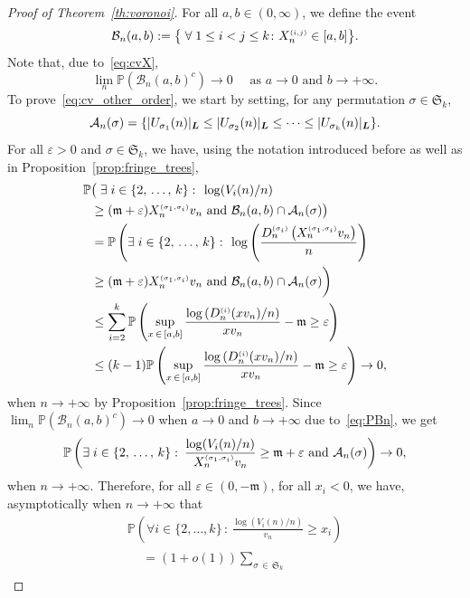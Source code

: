 \documentclass[AHL,Unicode,longabstracts,published]{cedram}
\newcommand{\bs}{\ensuremath{\boldsymbol}}
\newcommand{\sss}{\ensuremath{\scriptscriptstyle}}
\newcommand{\bbP}{\mathbb{P}}
\newcommand{\clA}{\mathcal{A}}
\newcommand{\clB}{\mathcal{B}}
\newcommand{\frkm}{\mathfrak{m}}
\newcommand{\frkS}{\mathfrak{S}}
\let\oldexists\exists
\renewcommand*{\exists}{\mathrel{\oldexists}}
\let\oldforall\forall
\renewcommand*{\forall}{\mathrel{\oldforall}}
\begin{document}
\begin{proof}[Proof of Theorem~\ref{th:voronoi}]
For all $a, b\in (0,\infty)$, we define the event
\[
\clB_n(a,b) := \big\{\forall 1\leq i<j\leq k\colon X_n^{\sss (i,j)}\in [a,b]\big\}.
\]
Note that, due to~\eqref{eq:cvX},
\begin{equation}\label{eq:PBn}
\lim_n \bbP(\clB_n(a,b)^c) \to 0 \quad \text{ as }a\to0 \text{ and }b\to+\infty.
\end{equation}
To prove~\eqref{eq:cv_other_order}, we start by setting, for any permutation $\sigma\in\frkS_k$,
\[
\clA_n(\sigma) = \{|U_{\sigma_1}(n)|_{\bs L}\leq |U_{\sigma_2}(n)|_{\bs L}\leq \cdots\leq |U_{\sigma_k}(n)|_{\bs L}\}.
\]
For all $\varepsilon>0$ and $\sigma\in\frkS_k$, we have, using the notation introduced before as well as in Proposition~\ref{prop:fringe_trees},
\begin{align}
\label{eq:distrEst}
\bbP &\big(\exists i \in \{2, \,\ldots,\, k\} \, \colon\,
\log (V_i(n)/n)\\
&\geq (\frkm+\varepsilon) X_n^{\sss (\sigma_1,\sigma_i)} v_n
\text{ and }\clB_n(a,b) \cap \clA_n(\sigma)\big)\nonumber
\\
 &=\bbP\left(\exists i \in \{2,\,\ldots,\,k\} \, \colon\,
\log \left(\frac{D_n^{\sss (\sigma_i)}\left({X^{\sss (\sigma_1, \sigma_i)}_n} v_n \right)}n\right)\right.\nonumber\\
&\geq (\frkm+\varepsilon) X_n^{\sss (\sigma_1,\sigma_i)}v_n
\text{ and }\clB_n(a,b)\cap \clA_n(\sigma)\bigg)\nonumber
\\
&\leq \sum_{i=2}^k\bbP\left(\sup_{x\,\in\,[a,b]} \frac{\log \left(D_n^{\sss (i)}(xv_n)/n\right)}{xv_n}-\frkm\geq \varepsilon\right)\nonumber\\
&
\leq (k-1)\bbP\left(\sup_{x\,\in\,[a,b]} \frac{\log \left(D_n^{\sss (i)}(xv_n)/n\right)}{xv_n}-\frkm\geq \varepsilon\right)\to 0,\nonumber
\end{align}
when $n\to+\infty$ by Proposition~\ref{prop:fringe_trees}. Since $\lim_n \bbP(\clB_n(a,b)^c) \to 0$ when $a\to0$ and $b\to+\infty$ due to~\eqref{eq:PBn}, we get
\[
\bbP\left(\exists i \in \{2,\, \ldots,\, k\} \, \colon\, \frac{\log (V_i(n)/n)}{X_n^{\sss (\sigma_1,\sigma_i)}v_n}\geq \frkm+\varepsilon \text{ and } \clA_n(\sigma)\right)\to 0,
\]
when $n\to+\infty$. Therefore, for all $\varepsilon\in(0, -\frkm)$, for all $x_i<0$, we have, asymptotically when $n\to+\infty$ that
\begin{multline*}
\bbP\left(\forall i \in \{2, \ldots, k\} \, \colon\, \frac{\log (V_i(n)/n)}{v_n}\geq x_i\right)\\
\begin{aligned}
&=(1+o(1))\sum_{\sigma\,\in\,\frkS_k}

\end{aligned}
\end{multline*}
\end{proof}
\end{document}
